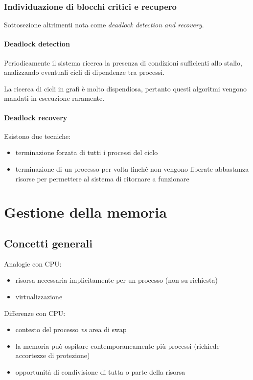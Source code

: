 \documentclass[12pt,a4paper]{article}
\begin{document}
\subsubsection{Individuazione di blocchi critici e recupero}
Sottosezione altrimenti nota come \emph{deadlock detection and recovery}.

\paragraph{Deadlock detection}
Periodicamente il sistema ricerca la presenza di condizioni sufficienti
allo stallo, analizzando eventuali cicli di dipendenze tra processi.

La ricerca di cicli in grafi è molto dispendiosa, pertanto questi
algoritmi vengono mandati in esecuzione raramente.

\paragraph{Deadlock recovery}
Esistono due tecniche:
\begin{itemize}
  \item terminazione forzata di tutti i processi del ciclo
  \item terminazione di un processo per volta finché non vengono
    liberate abbastanza risorse per permettere al sistema di ritornare
    a funzionare
\end{itemize}

\section{Gestione della memoria}

\subsection{Concetti generali}
Analogie con CPU:
\begin{itemize}
  \item risorsa necessaria implicitamente per un processo (non su
    richiesta)
  \item virtualizzazione
\end{itemize}

Differenze con CPU:
\begin{itemize}
  \item contesto del processo \emph{vs} area di swap
  \item la memoria può ospitare contemporaneamente più processi
    (richiede accortezze di protezione)
  \item opportunità di condivisione di tutta o parte della risorsa
\end{itemize}
\end{document}
